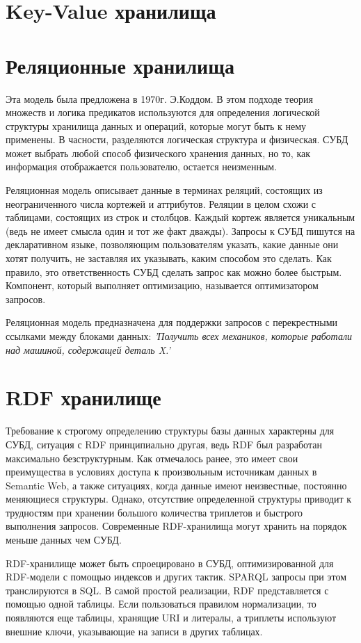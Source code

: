 \documentclass[specialist,subf,href,colorlinks=true
]{disser}
\begin{document}
\section{Key-Value хранилища}
\section{Реляционные хранилища}
Эта модель была предложена в 1970г. Э.Коддом. В этом подходе теория множеств и логика предикатов используются для определения логической структуры хранилища данных и операций, которые могут быть к нему применены. В часности, разделяются логическая структура и физическая. СУБД может выбрать любой способ физического хранения данных, но то, как информация отображается пользователю, остается неизменным.

Реляционная модель описывает данные в терминах реляций, состоящих из неограниченного числа кортежей и аттрибутов. Реляции в целом схожи с таблицами, состоящих из строк и столбцов. Каждый кортеж является уникальным (ведь не имеет смысла один и тот же факт дважды).  Запросы к СУБД пишутся на декларативном языке, позволяющим пользователям указать, какие данные они хотят получить, не заставляя их указывать, каким способом это сделать. Как правило, это ответственность СУБД сделать запрос как можно более быстрым. Компонент, который выполняет оптимизацию, называется оптимизатором запросов.

Реляционная модель предназначена для поддержки запросов с перекрестными ссылками между блоками данных: 
\textit{
  'Получить всех механиков, которые работали над машиной, содержащей деталь X.'
}

\section{RDF хранилище}
Требование к строгому определению структуры базы данных характерны для СУБД, ситуация с RDF принципиально другая, ведь RDF был разработан максимально безструктурным. Как отмечалось ранее, это имеет свои преимущества в условиях доступа к произвольным источникам данных в Semantic Web, а также ситуациях, когда данные имеют неизвестные, постоянно меняющиеся структуры. Однако, отсутствие определенной структуры приводит к трудностям при хранении большого количества триплетов и быстрого выполнения запросов. Современные RDF-хранилища могут хранить на порядок меньше данных чем СУБД.

RDF-хранилище может быть спроецировано в СУБД, оптимизированной для RDF-модели с помощью индексов и других тактик. SPARQL запросы при этом транслируются в SQL. В самой простой реализации, RDF представляется с помощью одной таблицы. Если пользоваться правилом нормализации, то появляются еще таблицы, хранящие URI и литералы, а триплеты используют внешние ключи, указывающие на записи в других таблицах. 
\end{document}
